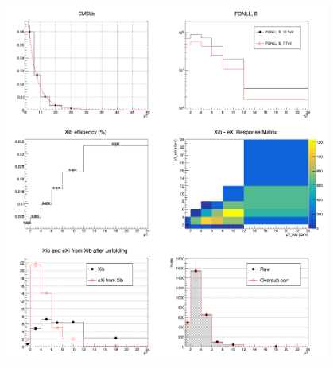 %
\begin{figure}[h]
    \centering
    \includegraphics[width=0.95\textwidth]{plots/s2_c1b_Bayes_stand3_INEL0_MB_0to100_bCorr.png}
    \caption{}
    \label{fig:s2_bCorr}
\end{figure}

\clearpage

\vspace{\columnsep}
